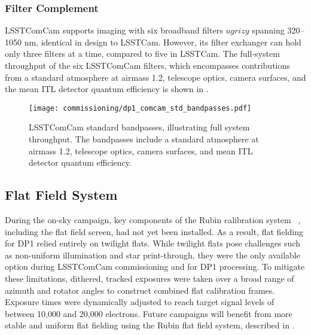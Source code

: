 \subsubsection{Filter Complement}
\label{sssec:comcam_filters}
\gls{LSSTComCam} supports imaging with six broadband filters $ugrizy$ spanning 320–1050 nm, identical in design to \gls{LSSTCam}.
However, its filter exchanger can hold only three filters at a time, compared to five in \gls{LSSTCam}.
The full-system throughput of the six \gls{LSSTComCam} filters, which encompasses contributions from a standard atmosphere at airmass 1.2, telescope optics, camera surfaces, and the mean \gls{ITL} detector quantum efficiency is shown in .
\begin{figure}[htb!]
\centering
\texttt{[image: commissioning/dp1\_comcam\_std\_bandpasses.pdf]}
\caption{LSSTComCam standard bandpasses, illustrating full system throughput. The bandpasses include a standard atmosphere at airmass 1.2, telescope optics, camera surfaces, and mean \gls{ITL} detector quantum efficiency.}
\label{fig:comcam_standard_bandpasses}
\vspace{0.1cm}
\end{figure}

\subsection{Flat Field System
\label{ssec:flat_field_system}}
During the on-sky campaign, key components of the Rubin calibration system ~\citep{2022SPIE12182E..0RI}, including the flat field screen, had not yet been installed.
As a result, flat fielding for \gls{DP1} relied entirely on twilight flats.
While twilight flats pose challenges such as non-uniform illumination and star print-through, they were the only available option during \gls{LSSTComCam} commissioning and for DP1 processing.
To mitigate these limitations, dithered, tracked exposures were taken over a broad range of azimuth and rotator angles to construct combined flat \gls{calibration} frames.
Exposure times were dynamically adjusted to reach target signal levels of between 10,000 and 20,000 electrons.
Future campaigns will benefit from more stable and uniform flat fielding using the Rubin flat field system, described in \citet{SITCOMTN-086}.

